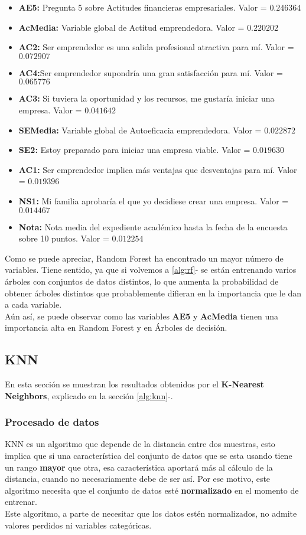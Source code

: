 \begin{itemize}
	\item\textbf{AE5:} Pregunta 5 sobre Actitudes financieras empresariales. Valor = $0.246364$
	\item\textbf{AcMedia:} Variable global de Actitud emprendedora. Valor = $0.220202$
	\item\textbf{AC2:} Ser emprendedor es una salida profesional atractiva para mí. Valor = $0.072907$
	\item\textbf{AC4:}Ser emprendedor supondría una gran satisfacción para mí. Valor = $0.065776$
	\item\textbf{AC3:} Si tuviera la oportunidad y los recursos, me gustaría iniciar una empresa. Valor = $0.041642$
	\item\textbf{SEMedia:} Variable global de Autoeficacia emprendedora. Valor = $0.022872$
	\item\textbf{SE2:} Estoy preparado para iniciar una empresa viable. Valor = $0.019630$
	\item\textbf{AC1:} Ser emprendedor implica más ventajas que desventajas para mí. Valor = $0.019396$
	\item\textbf{NS1:} Mi familia aprobaría el que yo decidiese crear una empresa. Valor = $0.014467$
	\item\textbf{Nota:} Nota media del expediente académico hasta la fecha de la encuesta sobre 10 puntos. Valor = $0.012254$
\end{itemize}
Como se puede apreciar, Random Forest ha encontrado un mayor número de variables. Tiene sentido, ya que si volvemos a \ref{alg:rf}- se están entrenando varios árboles con conjuntos de datos distintos, lo que aumenta la probabilidad de obtener árboles distintos que probablemente difieran en la importancia que le dan a cada variable.\\
Aún así, se puede observar como las variables \textbf{AE5} y \textbf{AcMedia} tienen una importancia alta en Random Forest y en Árboles de decisión.
\pagebreak
\subsection{KNN}
En esta sección se muestran los resultados obtenidos por el \textbf{K-Nearest Neighbors}, explicado en la sección \ref{alg:knn}-.
\subsubsection*{Procesado de datos}
KNN es un algoritmo que depende de la distancia entre dos muestras, esto implica que si una característica del conjunto de datos que se esta usando tiene un rango \textbf{mayor} que otra, esa característica aportará más al cálculo de la distancia, cuando no necesariamente debe de ser así. Por ese motivo, este algoritmo necesita que el conjunto de datos esté \textbf{normalizado} en el momento de entrenar.\\
\linebreak
Este algoritmo, a parte de necesitar que los datos estén normalizados, no admite valores perdidos ni variables categóricas.
